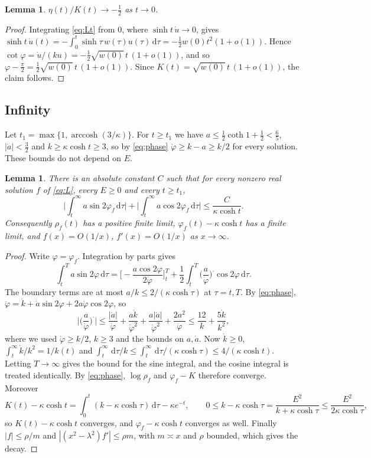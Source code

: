 \documentclass[11pt]{amsart}
\newtheorem{lemma}[theorem]{Lemma}
\theoremstyle{definition}
\newcommand{\dd}{\,\mathrm{d}}
\DeclareMathOperator{\arccosh}{arccosh}
\begin{document}
\begin{lemma}\label{lem:zero}
$\eta(t)/K(t)\to-\frac12$ as $t\to0$.
\end{lemma}

\begin{proof}
Integrating \eqref{eq:Lt} from $0$, where $\sinh t\,\dot u\to0$, gives $\sinh t\,\dot u(t)=-\int_0^t\sinh\tau\,w(\tau)u(\tau)\dd\tau=-\frac12 w(0)t^2(1+o(1))$. Hence $\cot\varphi=\dot u/(ku)=-\frac12\sqrt{w(0)}\,t\,(1+o(1))$, and so $\varphi-\frac\pi2=\frac12\sqrt{w(0)}\,t\,(1+o(1))$. Since $K(t)=\sqrt{w(0)}\,t\,(1+o(1))$, the claim follows.
\end{proof}

\subsection{Infinity}
Let $t_1=\max\{1,\arccosh(3/\kappa)\}$. For $t\ge t_1$ we have $a\le\frac12\coth1+\frac12<\frac65$, $|\dot a|<\frac32$ and $k\ge\kappa\cosh t\ge3$, so by \eqref{eq:phase} $\dot\varphi\ge k-a\ge k/2$ for every solution. These bounds do not depend on $E$.

\begin{lemma}\label{lem:infinity}
There is an absolute constant $C$ such that for every nonzero real solution $f$ of \eqref{eq:L}, every $E\ge0$ and every $t\ge t_1$,
\[
\Big|\int_t^\infty a\sin2\varphi_f\dd\tau\Big|+\Big|\int_t^\infty a\cos2\varphi_f\dd\tau\Big|\le\frac{C}{\kappa\cosh t}.
\]
Consequently $\rho_f(t)$ has a positive finite limit, $\varphi_f(t)-\kappa\cosh t$ has a finite limit, and $f(x)=O(1/x)$, $f'(x)=O(1/x)$ as $x\to\infty$.
\end{lemma}

\begin{proof}
Write $\varphi=\varphi_f$. Integration by parts gives
\[
\int_t^T a\sin2\varphi\dd\tau=\Big[-\frac{a\cos2\varphi}{2\dot\varphi}\Big]_t^T+\frac12\int_t^T\Big(\frac{a}{\dot\varphi}\Big)^{\boldsymbol\cdot}\cos2\varphi\dd\tau .
\]
The boundary terms are at most $a/k\le 2/(\kappa\cosh\tau)$ at $\tau=t,T$. By \eqref{eq:phase}, $\ddot\varphi=\dot k+\dot a\sin2\varphi+2a\dot\varphi\cos2\varphi$, so
\[
\Big|\Big(\frac{a}{\dot\varphi}\Big)^{\boldsymbol\cdot}\Big|\le\frac{|\dot a|}{\dot\varphi}+\frac{a\dot k}{\dot\varphi^2}+\frac{a|\dot a|}{\dot\varphi^2}+\frac{2a^2}{\dot\varphi}\le\frac{12}{k}+\frac{5\dot k}{k^2},
\]
where we used $\dot\varphi\ge k/2$, $k\ge3$ and the bounds on $a,\dot a$. Now $\dot k\ge0$, $\int_t^\infty\dot k/k^2=1/k(t)$ and $\int_t^\infty\dd\tau/k\le\int_t^\infty\dd\tau/(\kappa\cosh\tau)\le 4/(\kappa\cosh t)$. Letting $T\to\infty$ gives the bound for the sine integral, and the cosine integral is treated identically. By \eqref{eq:phase}, $\log\rho_f$ and $\varphi_f-K$ therefore converge. Moreover
\[
K(t)-\kappa\cosh t=\int_0^t(k-\kappa\cosh\tau)\dd\tau-\kappa e^{-t},\qquad 0\le k-\kappa\cosh\tau=\frac{E^2}{k+\kappa\cosh\tau}\le\frac{E^2}{2\kappa\cosh\tau},
\]
so $K(t)-\kappa\cosh t$ converges, and $\varphi_f-\kappa\cosh t$ converges as well. Finally $|f|\le\rho/m$ and $|(x^2-\lambda^2)f'|\le\rho m$, with $m\asymp x$ and $\rho$ bounded, which gives the decay.
\end{proof}
\end{document}
